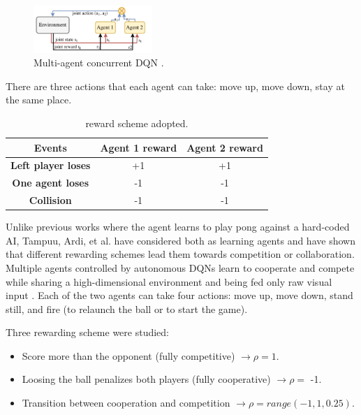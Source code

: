 \begin{figure}[ht]
  \centering
  \includegraphics[width=0.4\textwidth]{images/DQN_MAS.png}
  \caption{Multi-agent concurrent DQN \cite{diallo2017learning}.}
  \label{fig:dqnmas}
\end{figure}

There are three actions that each agent can take: move up, move down, stay at the same place.

\begin{table}[ht]
  \renewcommand{\arraystretch}{1.3}
  \caption{reward scheme adopted.}
  \label{tab:reward-scheme}
  \centering
  \begin{tabular}{@{}ccc@{}}
    \toprule
    \textbf{Events}            & \textbf{Agent 1 reward} & \textbf{Agent 2 reward} \\ \midrule
    \textbf{Left player loses} & +1                      & +1                      \\
    \textbf{One agent loses}   & -1                      & -1                      \\
    \textbf{Collision}         & -1                      & -1                      \\ \bottomrule
  \end{tabular}
\end{table}

Unlike previous works where the agent learns to play pong against a hard-coded AI, 
Tampuu, Ardi, et al. \cite{tampuu2017multiagent} have considered both as learning agents and have shown that different rewarding schemes lead them towards competition or collaboration.
%
Multiple agents controlled by autonomous DQNs learn to cooperate and compete while sharing a high-dimensional environment and being fed only raw visual input \cite{tampuu2017multiagent}.
%
Each of the two agents can take four actions: 
move up, move down, stand still, and fire (to relaunch the ball or to start the game).
%

\noindent
Three rewarding scheme were studied:
\begin{itemize}
  \item Score more than the opponent (fully competitive) $\rightarrow \rho = 1$.
  \item Loosing the ball penalizes both players (fully cooperative) $\rightarrow \rho = $ -1.
  \item Transition between cooperation and competition $\rightarrow \rho = range(-1, 1, 0.25)$.
\end{itemize}

